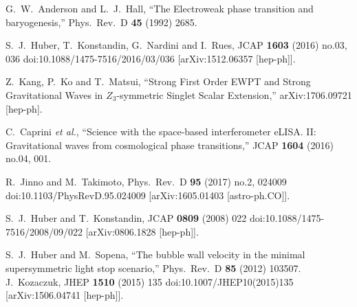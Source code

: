 \documentclass[12pt]{article}
\begin{document}
\begin{thebibliography}{99}
  
  G.~W.~Anderson and L.~J.~Hall,
  ``The Electroweak phase transition and baryogenesis,''
  Phys.\ Rev.\ D {\bf 45} (1992) 2685.

  S.~J.~Huber, T.~Konstandin, G.~Nardini and I.~Rues,
  JCAP {\bf 1603} (2016) no.03,  036
  doi:10.1088/1475-7516/2016/03/036
  [arXiv:1512.06357 [hep-ph]].

  
  Z.~Kang, P.~Ko and T.~Matsui,
  ``Strong First Order EWPT and Strong Gravitational Waves in $Z_3$-symmetric Singlet Scalar Extension,''
  arXiv:1706.09721 [hep-ph].

  C.~Caprini {\it et al.},
  ``Science with the space-based interferometer eLISA. II: Gravitational waves from cosmological phase transitions,''
  JCAP {\bf 1604} (2016) no.04,  001.

  R.~Jinno and M.~Takimoto,
  Phys.\ Rev.\ D {\bf 95} (2017) no.2,  024009
  doi:10.1103/PhysRevD.95.024009
  [arXiv:1605.01403 [astro-ph.CO]].

  
  S.~J.~Huber and T.~Konstandin,
  JCAP {\bf 0809} (2008) 022
  doi:10.1088/1475-7516/2008/09/022
  [arXiv:0806.1828 [hep-ph]].
  
  
  S.~J.~Huber and M.~Sopena,
  ``The bubble wall velocity in the minimal supersymmetric light stop scenario,''
  Phys.\ Rev.\ D {\bf 85} (2012) 103507.
  J.~Kozaczuk,
  JHEP {\bf 1510} (2015) 135
  doi:10.1007/JHEP10(2015)135
  [arXiv:1506.04741 [hep-ph]].


\end{thebibliography}
\end{document}
